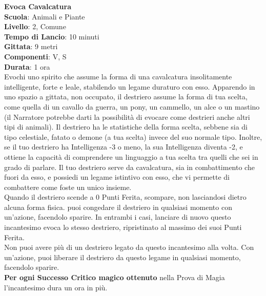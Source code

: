 \begin{multicols}{2}
\medskip\textbf{Evoca Cavalcatura}\\
\textbf{Scuola}: Animali e Piante\\
\textbf{Livello}: 2, Comune\\
\textbf{Tempo di Lancio}: 10 minuti\\
\textbf{Gittata}: 9 metri\\
\textbf{Componenti}: V, S\\
\textbf{Durata}: 1 ora\\
Evochi uno spirito che assume la forma di una cavalcatura insolitamente intelligente, forte e leale, stabilendo un legame duraturo con esso. Apparendo in uno spazio a gittata, non occupato, il destriero assume la forma di tua scelta, come quella di un cavallo da guerra, un pony, un cammello, un alce o un mastino (il Narratore potrebbe darti la possibilità di evocare come destrieri anche altri tipi di animali). Il destriero ha le statistiche della forma scelta, sebbene sia di tipo celestiale, fatato o demone (a tua scelta) invece del suo normale tipo. Inoltre, se il tuo destriero ha Intelligenza -3 o meno, la sua Intelligenza diventa -2, e ottiene la capacità di comprendere un linguaggio a tua scelta tra quelli che sei in grado di parlare. Il tuo destriero serve da cavalcatura, sia in combattimento che fuori da esso, e possiedi un legame istintivo con esso, che vi permette di combattere come foste un unico insieme.\\
Quando il destriero scende a 0 Punti Ferita, scompare, non lasciandosi dietro alcuna forma fisica. puoi congedare il destriero in qualsiasi momento con un'azione, facendolo sparire. In entrambi i casi, lanciare di nuovo questo incantesimo evoca lo stesso destriero, ripristinato al massimo dei suoi Punti Ferita.\\
Non puoi avere più di un destriero legato da questo incantesimo alla volta. Con un'azione, puoi liberare il destriero da questo legame in qualsiasi momento, facendolo sparire.\\
\textbf{Per ogni Successo Critico magico ottenuto} nella Prova di Magia l'incantesimo dura un ora in più.


\end{multicols}

